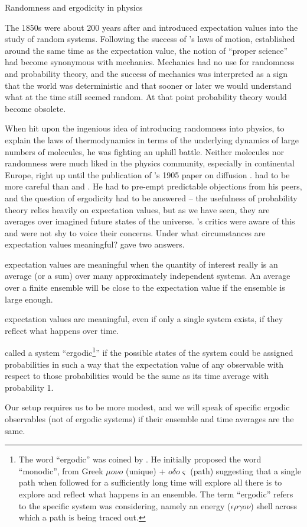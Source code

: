 \begin{history}{Randomness and ergodicity in physics}

The 1850s were about 200 years after  and  introduced expectation 
values into the study of random systems. Following the success of 's 
laws of motion, established around the same time as the expectation value, 
the notion of ``proper science'' had become synonymous with 
mechanics. Mechanics had no use for randomness and probability 
theory, and the success of mechanics was interpreted as a sign that 
the world was deterministic and that sooner or later we would understand 
what at the time still seemed random. At that point probability theory would 
become obsolete. 

When  hit upon the ingenious idea of introducing randomness into 
physics, to explain the laws of thermodynamics in terms of the underlying 
dynamics of large numbers of molecules, he was fighting an uphill battle. 
Neither molecules nor randomness were much liked in the physics 
community, especially in continental Europe, right up until the publication of 
's 1905 paper on diffusion \cite{Einstein1905}.  had to be 
more careful than  and . He had to pre-empt
predictable objections from his peers, and the question of ergodicity had to be 
answered -- the usefulness of probability theory relies heavily on expectation 
values, but as we have seen, they are averages over imagined future states of the 
universe. 's critics were aware of this and were not shy to voice their
concerns. Under what circumstances are expectation values meaningful? 
 gave two answers. 
\bi
\item expectation values are meaningful when 
the quantity of interest really is an average (or a sum) over many approximately 
independent systems. An average over a finite ensemble will be close to the 
expectation value if the ensemble is large enough. 
\item expectation values 
are meaningful, even if only a single system exists, if they reflect what happens over time. 
\ei

 called a system ``ergodic\footnote{The word ``ergodic'' was coined by . 
He initially proposed the word ``monodic'', from Greek $\mu o \nu o$ (unique) + $o\delta o \varsigma$ (path) suggesting 
that a single path when followed for a sufficiently long time will explore all there is to explore and reflect what happens 
in an ensemble. The term ``ergodic'' refers to the specific system  was considering, namely an energy 
($\epsilon \rho \gamma o \nu$) shell across which a path is being traced out.}'' if the possible 
states of the system could be assigned probabilities in such a way that
the expectation value of any observable with respect to those probabilities would 
be the same as its time average with probability 1.

Our setup requires us to be more modest, and we will speak of specific ergodic observables (not of ergodic systems) if their ensemble and time averages are the same.
\end{history}

